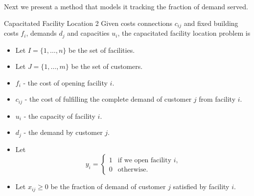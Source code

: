 \iffalse  %
Next we present a method that models it tracking the fraction of demand served.
\begin{general}{Capacitated Facility Location 2}{\npcomplete}
Given costs connections $c_{ij}$ and fixed building costs $f_i$, demands $d_j$ and capacities $u_i$, the capacitated facility location problem is 

\begin{itemize}
\item Let $I = \{1,\dots, n\}$ be the set of facilities.
\item Let $J = \{1, \dots, m\}$ be the set of customers.
\end{itemize}

\begin{itemize}
\item $f_i$ - the cost of opening facility $i$.
\item $c_{ij}$ - the cost of fulfilling the complete demand of customer $j$ from facility $i$.
\item $u_{i}$ - the capacity of facility $i$.
\item $d_{j}$ - the demand by customer $j$.
\end{itemize}

\begin{itemize}
\item Let 
\begin{equation*}
y_{i} = \begin{cases}
1 & \text{if we open facility $i$,}\\
0 & \text{otherwise.}
\end{cases}
\end{equation*}
\item Let $x_{ij} \geq 0$ be the fraction of demand of customer $j$ satisfied by facility $i$.
\end{itemize}


\end{general}
